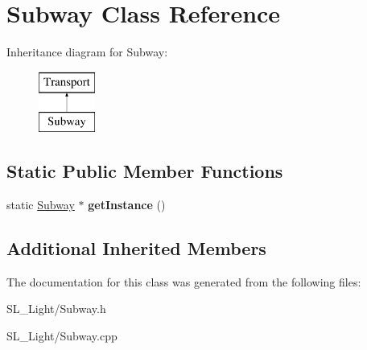 \hypertarget{class_subway}{}\section{Subway Class Reference}
\label{class_subway}
Inheritance diagram for Subway\+:\begin{figure}[H]
\begin{center}
\leavevmode
\includegraphics[height=2.000000cm]{class_subway}
\end{center}
\end{figure}
\subsection*{Static Public Member Functions}
\begin{DoxyCompactItemize}
\item 
\mbox{\label{class_subway_a6993fa51af883b01b87ed0fbf4d3187d}} 
static \mbox{\hyperlink{class_subway}{Subway}} $\ast$ {\bfseries get\+Instance} ()
\end{DoxyCompactItemize}
\subsection*{Additional Inherited Members}


The documentation for this class was generated from the following files\+:\begin{DoxyCompactItemize}
\item 
S\+L\+\_\+\+Light/Subway.\+h\item 
S\+L\+\_\+\+Light/Subway.\+cpp\end{DoxyCompactItemize}
